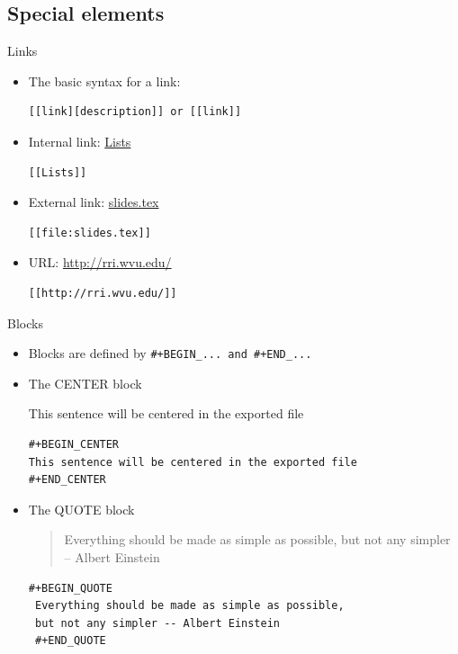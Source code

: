\documentclass[presentation]{beamer}
\begin{document}
\subsection*{Special elements}
\label{sec:org7923a3f}

\begin{frame}[fragile,label={sec:org58362df}]{Links}
 \begin{itemize}
\item The basic syntax for a link:
\begin{verbatim}
[[link][description]] or [[link]]
\end{verbatim}

\item Internal link: \hyperlink{sec:orgae52a35}{Lists}
\begin{verbatim}
[[Lists]]
\end{verbatim}

\item External link: \url{slides.tex}
\begin{verbatim}
[[file:slides.tex]]
\end{verbatim}

\item URL: \url{http://rri.wvu.edu/}
\begin{verbatim}
[[http://rri.wvu.edu/]]
\end{verbatim}
\end{itemize}
\end{frame}

\begin{frame}[fragile,label={sec:org3e9b803}]{Blocks}
 \begin{itemize}
\item Blocks are defined by \texttt{\#+BEGIN\_... and \#+END\_...}

\item The CENTER block

\begin{center}
This sentence will be centered in the exported file
\end{center}

\begin{verbatim}
#+BEGIN_CENTER
This sentence will be centered in the exported file
#+END_CENTER
\end{verbatim}

\item The QUOTE block

\begin{quote}
Everything should be made as simple as possible,
but not any simpler -- Albert Einstein
\end{quote}

\begin{verbatim}
#+BEGIN_QUOTE
 Everything should be made as simple as possible,
 but not any simpler -- Albert Einstein
 #+END_QUOTE
\end{verbatim}
\end{itemize}
\end{frame}
\end{document}
